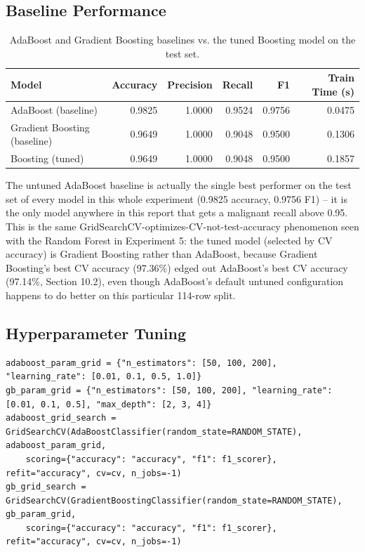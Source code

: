 \documentclass[11pt,a4paper]{article}
\begin{document}
\subsection{Baseline Performance}
\begin{table}[h]
\centering
\begin{tabular}{@{}lrrrrr@{}}
\toprule
Model & Accuracy & Precision & Recall & F1 & Train Time (s) \\
\midrule
AdaBoost (baseline) & 0.9825 & 1.0000 & 0.9524 & 0.9756 & 0.0475 \\
Gradient Boosting (baseline) & 0.9649 & 1.0000 & 0.9048 & 0.9500 & 0.1306 \\
Boosting (tuned) & 0.9649 & 1.0000 & 0.9048 & 0.9500 & 0.1857 \\
\bottomrule
\end{tabular}
\caption{AdaBoost and Gradient Boosting baselines vs. the tuned Boosting model on the test set.}
\end{table}
The untuned AdaBoost baseline is actually the single best performer on the test set of every model in this whole experiment (0.9825 accuracy, 0.9756 F1) -- it is the only model anywhere in this report that gets a malignant recall above 0.95. This is the same GridSearchCV-optimizes-CV-not-test-accuracy phenomenon seen with the Random Forest in Experiment 5: the tuned model (selected by CV accuracy) is Gradient Boosting rather than AdaBoost, because Gradient Boosting's best CV accuracy (97.36\%) edged out AdaBoost's best CV accuracy (97.14\%, Section 10.2), even though AdaBoost's default untuned configuration happens to do better on this particular 114-row split.

\subsection{Hyperparameter Tuning}
\begin{lstlisting}
adaboost_param_grid = {"n_estimators": [50, 100, 200], "learning_rate": [0.01, 0.1, 0.5, 1.0]}
gb_param_grid = {"n_estimators": [50, 100, 200], "learning_rate": [0.01, 0.1, 0.5], "max_depth": [2, 3, 4]}
adaboost_grid_search = GridSearchCV(AdaBoostClassifier(random_state=RANDOM_STATE), adaboost_param_grid,
    scoring={"accuracy": "accuracy", "f1": f1_scorer}, refit="accuracy", cv=cv, n_jobs=-1)
gb_grid_search = GridSearchCV(GradientBoostingClassifier(random_state=RANDOM_STATE), gb_param_grid,
    scoring={"accuracy": "accuracy", "f1": f1_scorer}, refit="accuracy", cv=cv, n_jobs=-1)
\end{lstlisting}
\end{document}
